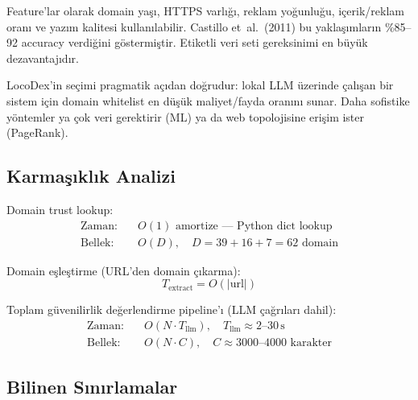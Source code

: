 Feature'lar olarak domain ya\c{s}{\i}, HTTPS varl{\i}\u{g}{\i}, reklam yo\u{g}unlu\u{g}u, i\c{c}erik/reklam oran{\i} ve yaz{\i}m kalitesi kullan{\i}labilir. Castillo et~al.\ (2011) bu yakla\c{s}{\i}mlar{\i}n \%85--92 accuracy verdi\u{g}ini g\"{o}stermi\c{s}tir. Etiketli veri seti gereksinimi en b\"{u}y\"{u}k dezavantaj{\i}d{\i}r.

\begin{dikkat}
LocoDex'in se\c{c}imi pragmatik a\c{c}{\i}dan do\u{g}rudur: lokal LLM \"{u}zerinde \c{c}al{\i}\c{s}an bir sistem i\c{c}in domain whitelist en d\"{u}\c{s}\"{u}k maliyet/fayda oran{\i}n{\i} sunar. Daha sofistike y\"{o}ntemler ya \c{c}ok veri gerektirir (ML) ya da web topolojisine eri\c{s}im ister (PageRank).
\end{dikkat}

\subsection{Karma\c{s}{\i}kl{\i}k Analizi}

Domain trust lookup:
\begin{align}
\text{Zaman:} &\quad O(1) \text{ amortize --- Python dict lookup} \\
\text{Bellek:} &\quad O(D), \quad D = 39 + 16 + 7 = 62 \text{ domain}
\end{align}

Domain e\c{s}le\c{s}tirme (URL'den domain \c{c}{\i}karma):
\begin{equation}
T_{\text{extract}} = O(|\text{url}|)
\end{equation}

Toplam g\"{u}venilirlik de\u{g}erlendirme pipeline'{\i} (LLM \c{c}a\u{g}r{\i}lar{\i} dahil):
\begin{align}
\text{Zaman:} &\quad O(N \cdot T_{\text{llm}}), \quad T_{\text{llm}} \approx 2\text{--}30\,\text{s} \\
\text{Bellek:} &\quad O(N \cdot C), \quad C \approx 3000\text{--}4000 \text{ karakter}
\end{align}

\subsection{Bilinen S{\i}n{\i}rlamalar}

